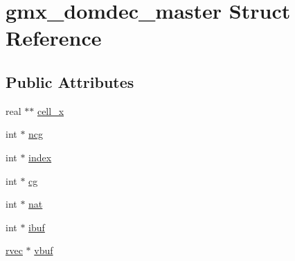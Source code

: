 \hypertarget{structgmx__domdec__master}{\section{gmx\-\_\-domdec\-\_\-master \-Struct \-Reference}
\label{structgmx__domdec__master}
}
\subsection*{\-Public \-Attributes}
\begin{DoxyCompactItemize}
\item 
real $\ast$$\ast$ \hyperlink{structgmx__domdec__master_a77afc5664dab8e747dd482b4cb8ce603}{cell\-\_\-x}
\item 
int $\ast$ \hyperlink{structgmx__domdec__master_ab1c0bdde74cee459312d4c3fb7dcf530}{ncg}
\item 
int $\ast$ \hyperlink{structgmx__domdec__master_a6caae31204239f70934ee298722e1e3a}{index}
\item 
int $\ast$ \hyperlink{structgmx__domdec__master_ab5c142f20339591f4bc880d33013374a}{cg}
\item 
int $\ast$ \hyperlink{structgmx__domdec__master_a9977c7c79d5bcab35a5358fbafba2ff1}{nat}
\item 
int $\ast$ \hyperlink{structgmx__domdec__master_a2641f3d6b2b5452c7f2467c0917bda45}{ibuf}
\item 
\hyperlink{share_2template_2gromacs_2types_2simple_8h_aa02a552a4abd2f180c282a083dc3a999}{rvec} $\ast$ \hyperlink{structgmx__domdec__master_adf2d658e351ccdd7a8b9b83be347c088}{vbuf}
\end{DoxyCompactItemize}


